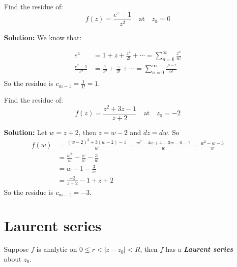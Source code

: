 \begin{example}
    Find the residue of:
    $$f(z) = \frac{e^z -1}{z^2} \quad \text{at} \quad z_0 = 0$$

    \textbf{Solution:} We know that:

    \begin{align*}
        e^z                 & = 1 + z + \frac{z^2}{2!} + \cdots = \sum_{n=0}^{\infty} \frac{z^n}{n!}           \\
        \frac{e^z - 1}{z^2} & = \frac{1}{z^2} + \frac{z}{2!} + \cdots = \sum_{n=0}^{\infty} \frac{z^{n-2}}{n!} \\
    \end{align*}
    So the residue is $c_{m-1} = \frac{1}{1!} = 1$.
\end{example}

\begin{example}
    Find the residue of:
    $$ f(z) = \frac{z^2 + 3z -1}{z+2} \quad \text{at} \quad z_0 = -2$$

    \textbf{Solution:}
    Let $w = z + 2$, then $z = w - 2$ and $dz = dw$. So
    \begin{align*}
        f(w) & = \frac{(w-2)^2 + 3(w-2) - 1}{w} = \frac{w^2 - 4w + 4 + 3w - 6 - 1}{w} = \frac{w^2 - w - 3}{w} \\
             & = \frac{w^2}{w} - \frac{w}{w} - \frac{3}{w}                                                    \\
             & = w - 1 - \frac{3}{w}                                                                          \\
             & = \frac{-3}{z + 2} - 1 + z + 2
    \end{align*}
    So the residue is $c_{m-1} = -3$.
\end{example}

\section{Laurent series}

\begin{definition}
    Suppose $f$ is analytic on $0 \leq r < |z - z_0| < R$, then $f$ has a \textbf{\textit{Laurent series}} about $z_0$.
\end{definition}

